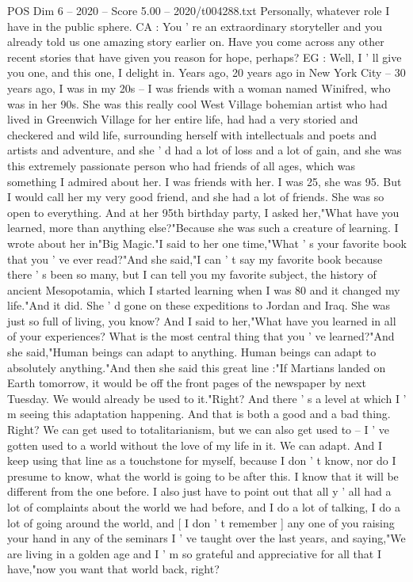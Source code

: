 \begin{textsample}{POS Dim 6 – 2020 – Score 5.00 – 2020/t004288.txt}
Personally, whatever role I have in the public sphere.
CA : You ' re an extraordinary storyteller and you already told us one amazing story earlier on.
Have you come across any other recent stories that have given you reason for hope, perhaps?
EG : Well, I ' ll give you one, and this one, I delight in.
Years ago, 20 years ago in New York City -- 30 years ago, I was in my 20s -- I was friends with a woman named Winifred, who was in her 90s.
She was this really cool West Village bohemian artist who had lived in Greenwich Village for her entire life, had had a very storied and checkered and wild life, surrounding herself with intellectuals and poets and artists and adventure, and she ' d had a lot of loss and a lot of gain, and she was this extremely passionate person who had friends of all ages, which was something I admired about her.
I was friends with her.
I was 25, she was 95.
But I would call her my very good friend, and she had a lot of friends.
She was so open to everything.
And at her 95th birthday party, I asked her,"What have you learned, more than anything else?"Because she was such a creature of learning.
I wrote about her in"Big Magic."I said to her one time,"What ' s your favorite book that you ' ve ever read?"And she said,"I can ' t say my favorite book because there ' s been so many, but I can tell you my favorite subject, the history of ancient Mesopotamia, which I started learning when I was 80 and it changed my life."And it did.
She ' d gone on these expeditions to Jordan and Iraq.
She was just so full of living, you know?
And I said to her,"What have you learned in all of your experiences?
What is the most central thing that you ' ve learned?"And she said,"Human beings can adapt to anything.
Human beings can adapt to absolutely anything."And then she said this great line :"If Martians landed on Earth tomorrow, it would be off the front pages of the newspaper by next Tuesday.
We would already be used to it."Right?
And there ' s a level at which I ' m seeing this adaptation happening.
And that is both a good and a bad thing.
Right?
We can get used to totalitarianism, but we can also get used to -- I ' ve gotten used to a world without the love of my life in it.
We can adapt.
And I keep using that line as a touchstone for myself, because I don ' t know, nor do I presume to know, what the world is going to be after this.
I know that it will be different from the one before.
I also just have to point out that all y ' all had a lot of complaints about the world we had before, and I do a lot of talking, I do a lot of going around the world, and [ I don ' t remember ] any one of you raising your hand in any of the seminars I ' ve taught over the last years, and saying,"We are living in a golden age and I ' m so grateful and appreciative for all that I have,"now you want that world back, right?

\end{textsample}
